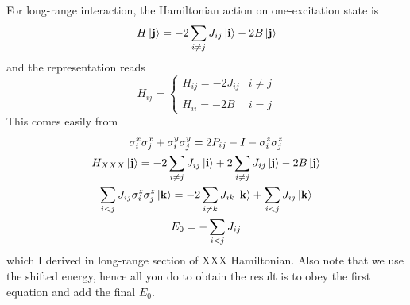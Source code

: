 \documentclass[../../../main.tex]{subfiles}
\begin{document}
For long-range interaction, the Hamiltonian action on one-excitation state is
\begin{equation*}
  H\ket{\mathbf j}
  =
  -2\sum_{i\neq j}J_{ij}\ket{\mathbf i}
  -2B\ket{\mathbf j}
\end{equation*}
and the representation reads
\begin{equation*}
  H_{ij} =
  \begin{cases}
    H_{ij} =- 2J_{ij} & i\neq j \\\\
    H_{ii} = -2B      & i=j
  \end{cases}
\end{equation*}
This comes easily from
\begin{gather*}
  \sigma_i^x\sigma_j^x+\sigma_i^y\sigma_j^y=
  2P_{ij}-I-\sigma_i^z\sigma_j^z\\
  H_{XXX} \ket{\mathbf{j} } =
  -2\sum_{i \neq j}J_{ij}  \ket{\mathbf{i}} +2 \sum_{i \neq j}  J_{ij}\ket{\mathbf{j}} -2B\ket{\mathbf{j}}    \\
  \sum_{i<j} J_{ij} \sigma^z_i \sigma^z_j \ket{\mathbf{k}}
  = - 2 \sum_{i \neq k} J_{ik} \ket{\mathbf{k}}  + \sum_{i<j} J_{ij} \ket{\mathbf{k}}\\
  E_0 = -\sum_{i<j}J_{ij}
\end{gather*}
which I derived in long-range section of XXX Hamiltonian.
Also note that we use the shifted energy, hence all you do to obtain the result is to obey the first equation and add the final $E_0$.
\end{document}
